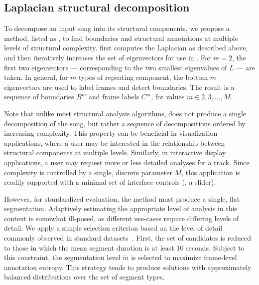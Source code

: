 \documentclass{article}
\begin{document}
\subsection{Laplacian structural decomposition}

To decompose an input song into its structural components, we propose a method, listed
as ,
to find boundaries and structural annotations at multiple levels of structural
complexity.   first computes the Laplacian as described above, and
then iteratively increases the set of eigenvectors for use in .  For $m=2$,
the first two eigenvectors --- corresponding to the two smallest eigenvalues of $L$
--- are taken.  In general, for $m$ types of repeating component, the bottom $m$
eigenvectors are used to label frames and detect boundaries.  The result is a sequence
of boundaries $B^m$ and frame labels $C^m$, for values $m \in 2, 3, \dots, M$.

Note that unlike most structural analysis algorithms,  does not produce a
single decomposition of the song, but rather a sequence of decompositions ordered by 
increasing complexity.  This property can be beneficial in visualization applications,
where a user may be interested in the relationship between structural components at
multiple levels.  Similarly, in interactive display applications, a user may request 
more or less detailed analyses for a track.  Since complexity is controlled by
a single, discrete parameter $M$, this application is readily supported with a minimal
set of interface controls (\eg, a slider).

However, for standardized evaluation, the method must produce a single, flat
segmentation.  Adaptively estimating the appropriate level of analysis in
this context is somewhat ill-posed, as different use-cases require differing levels of 
detail.  We apply a simple selection criterion based on the level of detail
commonly observed in standard datasets~\cite{harte2010towards,smith2011design}.  
First, the set of candidates is reduced to those in which the mean segment duration is 
at least 10 seconds.  
Subject to this constraint, the segmentation level $\tilde{m}$ is selected to maximize
frame-level annotation entropy.  This strategy tends to produce solutions with 
approximately balanced distributions over the set of segment types.  
\end{document}
